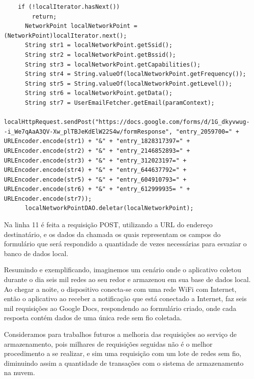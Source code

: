 \documentclass[12pt, %
openright, 
oneside,
a4paper,
brazil]{facom-ufu-abntex2}
\begin{document}
\begin{lstlisting}
	if (!localIterator.hasNext())
        return;
      NetworkPoint localNetworkPoint = (NetworkPoint)localIterator.next();
      String str1 = localNetworkPoint.getSsid();
      String str2 = localNetworkPoint.getBssid();
      String str3 = localNetworkPoint.getCapabilities();
      String str4 = String.valueOf(localNetworkPoint.getFrequency());
      String str5 = String.valueOf(localNetworkPoint.getLevel());
      String str6 = localNetworkPoint.getData();
      String str7 = UserEmailFetcher.getEmail(paramContext);
      localHttpRequest.sendPost("https://docs.google.com/forms/d/1G_dkyvwug--i_We7qAaA3QV-Xw_plTBJeKdElW22S4w/formResponse", "entry_2059700=" + URLEncoder.encode(str1) + "&" + "entry_1828317397=" + URLEncoder.encode(str2) + "&" + "entry_2146852893=" + URLEncoder.encode(str3) + "&" + "entry_312023197=" + URLEncoder.encode(str4) + "&" + "entry_644637792=" + URLEncoder.encode(str5) + "&" + "entry_604910793=" + URLEncoder.encode(str6) + "&" + "entry_612999935= " + URLEncoder.encode(str7));
      localNetworkPointDAO.deletar(localNetworkPoint);
\end{lstlisting}  

 Na linha 11 é feita a requisição POST, utilizando a URL do endereço destinatário, e os dados da chamada os quais representam os campos do formulário que será respondido a quantidade de vezes necessárias para esvaziar o banco de dados local. 
 
Resumindo e exemplificando, imaginemos um cenário onde o aplicativo coletou durante o dia seis mil redes ao seu redor e armazenou em sua base de dados local. Ao chegar a noite, o dispositivo conecta-se com uma rede \ac{WiFi} com Internet, então o aplicativo ao receber a notificação que está conectado a Internet, faz seis mil requisições ao Google Docs, respondendo ao formulário criado, onde cada resposta contém dados de uma única rede sem fio coletada.

Consideramos para trabalhos futuros a melhoria das requisições ao serviço de armazenamento, pois milhares de requisições seguidas não é o melhor procedimento a se realizar, e sim uma requisição com um lote de redes sem fio, diminuindo assim a quantidade de transações com o sistema de armazenamento na nuvem.
 
\end{document}

